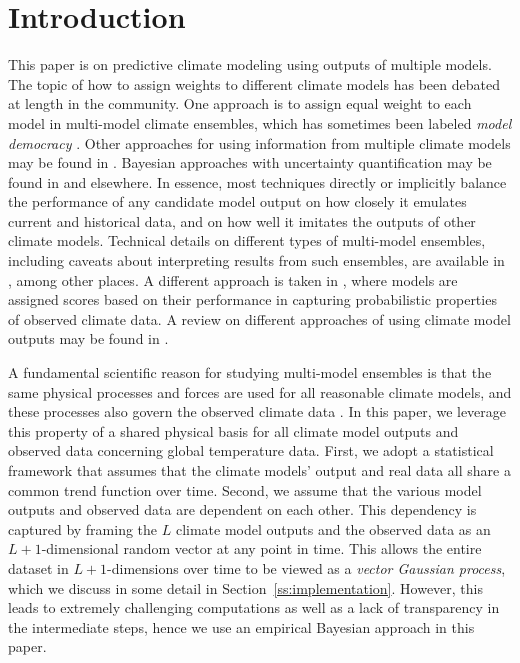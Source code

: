 \documentclass{CUP-JNL-EDS}
\begin{document}
\section[Introduction]{Introduction}

This paper is on predictive climate modeling using outputs of multiple models. The topic of how to assign weights to different climate models has been debated at length in the community. One approach is to assign equal weight to each model in multi-model climate ensembles, which has sometimes been labeled \textit{model democracy} \cite{knutti2010end}. Other approaches for using information from multiple climate models may be found in \cite{abramowitz2019esd, craigmile2017regional, knutti2017climate, sanderson2015representative, sanderson2017skill, flato2014evaluation}. Bayesian approaches with uncertainty quantification may be found in \cite{tebaldi2005quantifying, smith2009bayesian} and elsewhere. In essence, most techniques directly or implicitly balance the performance of any candidate model output on how closely it emulates current and historical data, and on how well it imitates the outputs of other climate models. Technical details on different types of multi-model ensembles, including caveats about interpreting results from such ensembles, are available in 
\cite{tebaldi2007use, knutti2010challenges, knutti2010good, knutti2013climate, knutti2010end, sunyer2014bayesian, sanderson2015addressing, knutti2017climate, sanderson2017skill, lorenz2018prospects, abramowitz2018model, herger2018selecting}, 
among other places. 
A different approach is taken in \cite{braverman2017probabilistic, chatterjee2019scale}, where models are assigned scores based on their performance in capturing probabilistic properties of observed climate data.
A review on different approaches of using climate model outputs may be found in \cite{gong2020evaluation}.

A fundamental scientific reason for studying multi-model ensembles is that the same physical processes and forces are used for all reasonable climate models, and these processes also govern the observed climate data \cite{masson2011climate}. In this paper, we leverage this property of a shared physical basis for all climate model outputs and observed data concerning global temperature data. First,  we adopt a statistical framework that assumes that the climate models' output and real data all share a common trend function over time. Second, we assume that the various model outputs and observed data are dependent on each other. This dependency is captured by framing the $L$ climate model outputs and the observed data as an $L+1$-dimensional random vector at any point in time. This allows the entire dataset in $L+1$-dimensions over time to be viewed as a \textit{vector Gaussian process}, which we discuss in some detail in Section~\ref{ss:implementation}. However, this leads to extremely challenging computations as well as a lack of transparency in the intermediate steps, hence we use an empirical Bayesian approach in this paper. 
\end{document}
